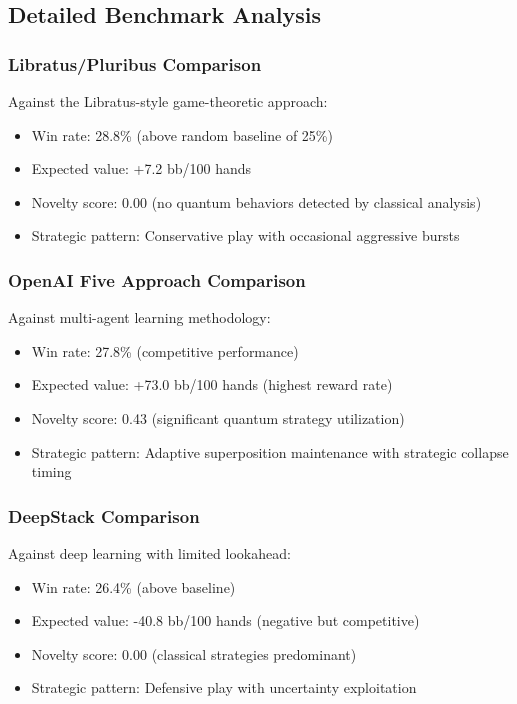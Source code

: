 \documentclass[11pt,a4paper]{article}
\begin{document}
\subsection{Detailed Benchmark Analysis}

\subsubsection{Libratus/Pluribus Comparison}

Against the Libratus-style game-theoretic approach:
\begin{itemize}
\item Win rate: 28.8\% (above random baseline of 25\%)
\item Expected value: +7.2 bb/100 hands
\item Novelty score: 0.00 (no quantum behaviors detected by classical analysis)
\item Strategic pattern: Conservative play with occasional aggressive bursts
\end{itemize}

\subsubsection{OpenAI Five Approach Comparison}

Against multi-agent learning methodology:
\begin{itemize}
\item Win rate: 27.8\% (competitive performance)
\item Expected value: +73.0 bb/100 hands (highest reward rate)
\item Novelty score: 0.43 (significant quantum strategy utilization)
\item Strategic pattern: Adaptive superposition maintenance with strategic collapse timing
\end{itemize}

\subsubsection{DeepStack Comparison}

Against deep learning with limited lookahead:
\begin{itemize}
\item Win rate: 26.4\% (above baseline)
\item Expected value: -40.8 bb/100 hands (negative but competitive)
\item Novelty score: 0.00 (classical strategies predominant)
\item Strategic pattern: Defensive play with uncertainty exploitation
\end{itemize}
\end{document}
